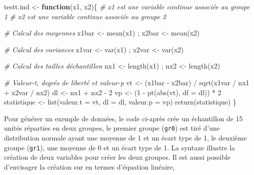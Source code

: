 \documentclass[
]{book}
\newenvironment{Shaded}{}{}
\newcommand{\AttributeTok}[1]{#1}
\newcommand{\CommentTok}[1]{\textit{#1}}
\newcommand{\ControlFlowTok}[1]{\textbf{#1}}
\newcommand{\DecValTok}[1]{#1}
\newcommand{\FunctionTok}[1]{#1}
\newcommand{\NormalTok}[1]{#1}
\newcommand{\OtherTok}[1]{#1}
\newcommand{\SpecialCharTok}[1]{#1}
\begin{document}
\begin{Shaded}
\begin{Highlighting}[]
\NormalTok{testt.ind }\OtherTok{\textless{}{-}} \ControlFlowTok{function}\NormalTok{(x1, x2)\{}
  \CommentTok{\# x1 est une variable continue associée au groupe 1}
  \CommentTok{\# x2 est une variable continue associée au groupe 2}
  
  \CommentTok{\# Calcul des moyennes}
\NormalTok{  x1bar }\OtherTok{\textless{}{-}} \FunctionTok{mean}\NormalTok{(x1) ; x2bar }\OtherTok{\textless{}{-}} \FunctionTok{mean}\NormalTok{(x2)}
  
  \CommentTok{\# Calcul des variances}
\NormalTok{  x1var }\OtherTok{\textless{}{-}} \FunctionTok{var}\NormalTok{(x1) ; x2var }\OtherTok{\textless{}{-}} \FunctionTok{var}\NormalTok{(x2)}
  
  \CommentTok{\# Calcul des tailles d\textquotesingle{}échantillon}
\NormalTok{  nx1 }\OtherTok{\textless{}{-}} \FunctionTok{length}\NormalTok{(x1) ; nx2 }\OtherTok{\textless{}{-}} \FunctionTok{length}\NormalTok{(x2)}
  
  \CommentTok{\# Valeur{-}t, degrés de liberté et valeur{-}p}
\NormalTok{  vt }\OtherTok{\textless{}{-}}\NormalTok{ (x1bar }\SpecialCharTok{{-}}\NormalTok{ x2bar) }\SpecialCharTok{/} \FunctionTok{sqrt}\NormalTok{(x1var }\SpecialCharTok{/}\NormalTok{ nx1 }\SpecialCharTok{+}\NormalTok{ x2var }\SpecialCharTok{/}\NormalTok{ nx2)}
\NormalTok{  dl }\OtherTok{\textless{}{-}}\NormalTok{ nx1 }\SpecialCharTok{+}\NormalTok{ nx2 }\SpecialCharTok{{-}} \DecValTok{2}
\NormalTok{  vp }\OtherTok{\textless{}{-}}\NormalTok{ (}\DecValTok{1} \SpecialCharTok{{-}} \FunctionTok{pt}\NormalTok{(}\FunctionTok{abs}\NormalTok{(vt), }\AttributeTok{df =}\NormalTok{ dl)) }\SpecialCharTok{*} \DecValTok{2} 
\NormalTok{  statistique }\OtherTok{\textless{}{-}} \FunctionTok{list}\NormalTok{(}\AttributeTok{valeur.t =}\NormalTok{ vt, }\AttributeTok{dl =}\NormalTok{ dl, }\AttributeTok{valeur.p =}\NormalTok{ vp)}
  \FunctionTok{return}\NormalTok{(statistique)}
\NormalTok{\}}
\end{Highlighting}
\end{Shaded}

Pour générer un exemple de données, le code ci-après crée un échantillon de 15 unités réparties en deux groupes, le premier groupe (\texttt{gr0}) est tiré d'une distribution normale ayant une moyenne de 1 et un écart type de 1, le deuxième groupe (\texttt{gr1}), une moyenne de 0 et un écart type de 1. La syntaxe illustre la création de deux variables pour créer les deux groupes. Il est aussi possible d'envisager la création sur en termes d'équation linéaire,
\end{document}
